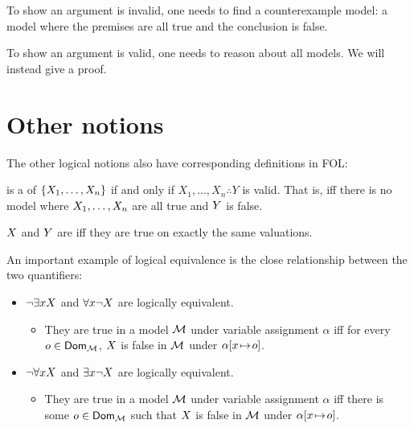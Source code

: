 \begin{highlighted}
	To show an argument is invalid, one needs to find a counterexample model: a model where the premises are all true and the conclusion is false. 
	
	To show an argument is valid, one needs to reason about all models. We will instead give a proof.
\end{highlighted}



\section{Other notions}

The other logical notions also have corresponding definitions in FOL:

\begin{definition}
	\metaY is a  of $\{X_1,\ldots,X_n\}$ if and only if $X_1,\ldots,X_n\therefore Y$ is {valid}. That is, iff there is no model where $X_1,\ldots, X_n$ are all true and $Y$ is false. 
\end{definition}

\begin{definition}
	$X$ and $Y$ are  iff they are true on exactly the same valuations.
\end{definition}

An important example of logical equivalence is the close relationship between the two quantifiers:
\begin{itemize}
	\item $\neg\exists xX$ and $\forall x\neg X$ are logically equivalent.
	\begin{itemize}
		\item They are true in a model ${\mathcal{M}}$ under variable assignment $\alpha$ iff for every $o\in\mathsf{Dom}_{\mathcal{M}}$, $X$ is false in ${\mathcal{M}}$ under $\alpha[x \!\mapsto\! o]$. 
	\end{itemize}
	\item $\neg\forall xX$ and $\exists x\neg X$ are logically equivalent.
		\begin{itemize}
		\item They are true in a model ${\mathcal{M}}$ under variable assignment $\alpha$ iff there is some $o\in\mathsf{Dom}_{\mathcal{M}}$ such that $X$ is false in ${\mathcal{M}}$ under $\alpha[x \!\mapsto\! o]$. 
	\end{itemize}
\end{itemize}


